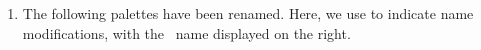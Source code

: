 \documentclass{tutodoc}
\begin{document}

\begin{enumerate}
    \item The following palettes have been renamed. Here, we use 
    \boxed{{\Rightarrow}\vphantom{pM}} to indicate name modifications,
    with the \thisproj\ name displayed on the right.
\end{enumerate}

\end{document}

